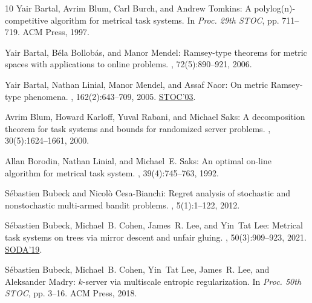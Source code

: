 \begin{thebibliography}{10}
{\sc Yair Bartal, Avrim Blum, Carl Burch, and Andrew Tomkins}: A
  polylog(n)-competitive algorithm for metrical task systems.
\newblock In {\em Proc. 29th STOC}, pp. 711--719. ACM Press, 1997.
\newblock [\epfmtdoi{10.1145/258533.258667}]

{\sc Yair Bartal, B\'ela Bollob\'as, and Manor Mendel}: Ramsey-type theorems
  for metric spaces with applications to online problems.
, 72(5):890--921, 2006.

{\sc Yair Bartal, Nathan Linial, Manor Mendel, and Assaf Naor}: On metric
  {R}amsey-type phenomena.
, 162(2):643--709, 2005.
\newblock \prelim \href{https://doi.org/10.1145/780542.780610}{STOC'03}.

{\sc Avrim Blum, Howard Karloff, Yuval Rabani, and Michael Saks}: A
  decomposition theorem for task systems and bounds for randomized server
  problems.
, 30(5):1624--1661, 2000.
\newblock [\epfmtdoi{10.1137/S0097539799351882}]

{\sc Allan Borodin, Nathan Linial, and Michael~E. Saks}: An optimal on-line
  algorithm for metrical task system.
, 39(4):745--763, 1992.
\newblock [\epfmtdoi{10.1145/146585.146588}]

{\sc S{\'{e}}bastien Bubeck and Nicol{\`{o}} Cesa{-}Bianchi}: Regret analysis
  of stochastic and nonstochastic multi-armed bandit problems.
, 5(1):1--122, 2012.

{\sc S{\'{e}}bastien Bubeck, Michael~B. Cohen, James~R. Lee, and Yin~Tat Lee}:
  Metrical task systems on trees via mirror descent and unfair gluing.
, 50(3):909--923, 2021.
\newblock \prelim \href{https://doi.org/10.1137/1.9781611975482.6}{SODA'19}.

{\sc S{\'{e}}bastien Bubeck, Michael~B. Cohen, Yin~Tat Lee, James~R. Lee, and
  Aleksander Madry}: $k$-server via multiscale entropic regularization.
\newblock In {\em Proc. 50th STOC}, pp. 3--16. ACM Press, 2018.


\end{thebibliography}
